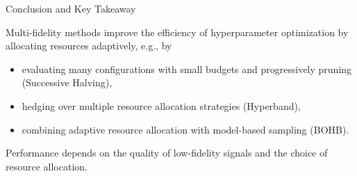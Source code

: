 \documentclass[main]{subfiles}
\begin{document}
\begin{frame}{Conclusion and Key Takeaway}

Multi-fidelity methods improve the efficiency of hyperparameter optimization by allocating resources adaptively, e.g., by
\begin{itemize}
    \item evaluating many configurations with small budgets and progressively pruning (Successive Halving),
    \item hedging over multiple resource allocation strategies (Hyperband),
    \item combining adaptive resource allocation with model-based sampling (BOHB).
\end{itemize}

\vspace{0.5cm}

Performance depends on the quality of low-fidelity signals and the choice of resource allocation.
\end{frame}
\end{document}
